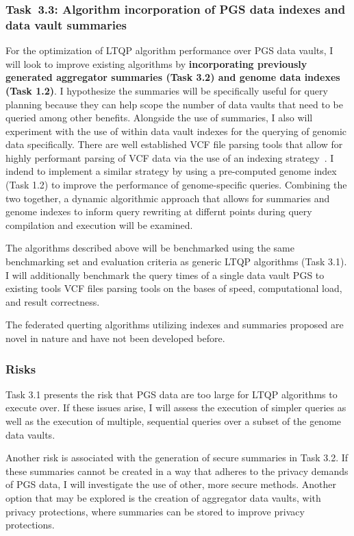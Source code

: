 \documentclass[a4paper,11pt]{article}
\begin{document}
\begin{refsection}
\newcommand\WPcc{Algorithm incorporation of PGS data indexes and data vault summaries}
\subsubsection{Task~3.3: \WPcc}

For the optimization of LTQP algorithm performance over PGS data vaults, I will look to improve existing algorithms by \textbf{incorporating previously generated aggregator summaries (Task 3.2) and genome data indexes (Task 1.2)}.
I hypothesize the summaries will be specifically useful for query planning because they can help scope the number of data vaults that need to be queried among other benefits. 
Alongside the use of summaries, I also will experiment with the use of within data vault indexes for the querying of genomic data specifically. 
There are well established VCF file parsing tools that allow for highly performant parsing of VCF data via the use of an indexing strategy~\cite{yang_seqminer2_2020}. 
I indend to implement a similar strategy by using a pre-computed genome index (Task 1.2) to improve the performance of genome-specific queries. 
Combining the two together, a dynamic algorithmic approach that allows for summaries and genome indexes to inform query rewriting at differnt points during query compilation and execution will be examined.  


The algorithms described above will be benchmarked using the same benchmarking set and evaluation criteria as generic LTQP algorithms (Task 3.1). 
I will additionally benchmark the query times of a single data vault PGS to existing tools VCF files parsing tools on the bases of speed, computational load, and result correctness.

The federated querting algorithms utilizing indexes and summaries proposed are novel in nature and have not been developed before. 

\subsubsection{Risks}
Task 3.1 presents the risk that PGS data are too large for LTQP algorithms to execute over. 
If these issues arise, I will assess the execution of simpler queries as well as the execution of multiple, sequential queries over a subset of the genome data vaults.

Another risk is associated with the generation of secure summaries in Task 3.2. 
If these summaries cannot be created in a way that adheres to the privacy demands of PGS data, I will investigate the use of other, more secure methods.
Another option that may be explored is the creation of aggregator data vaults, with privacy protections, where summaries can be stored to improve privacy protections.


\end{refsection}
\end{document}

